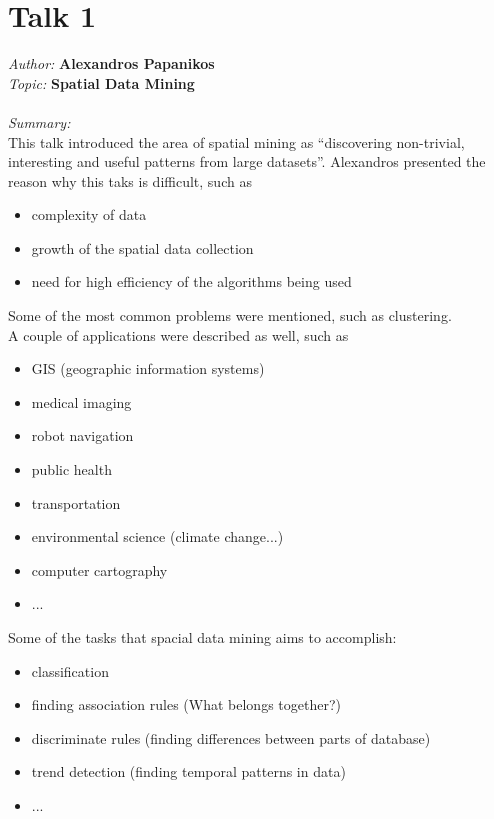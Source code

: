 \documentclass[runningheads,a4paper]{llncs}
\begin{document}
\section{Talk 1}
\textit{Author:} \textbf{Alexandros Papanikos}\\
\textit{Topic:}\hspace{0.25cm} \textbf{Spatial Data Mining}\\
\\
\textit{Summary:} \\
This talk introduced the area of spatial mining as ``discovering non-trivial, interesting and useful patterns from large datasets''. Alexandros presented the reason why this taks is difficult, such as
\begin{itemize}
\item complexity of data
\item growth of the spatial data collection
\item need for high efficiency of the algorithms being used
\end{itemize}
Some of the most common problems were mentioned,  such as clustering.\\
A couple of applications were described as well, such as
\begin{itemize}
\item GIS (geographic information systems)
\item medical imaging
\item robot navigation
\item public health
\item transportation
\item environmental science (climate change...)
\item computer cartography
\item ...
\end{itemize}
Some of the tasks that spacial data mining aims to accomplish:
\begin{itemize}
\item classification
\item finding association rules (What belongs together?)
\item discriminate rules (finding differences between parts of database)
\item trend detection (finding temporal patterns in data)
\item ...
\end{itemize}
\end{document}
